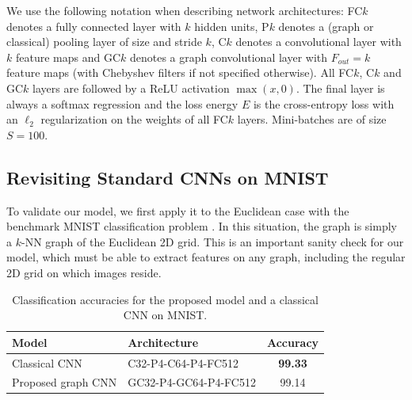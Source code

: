 \documentclass{article}
\newcommand{\todo}[1]{{\color{red} #1 }}
\begin{document}
We use the following notation when describing network architectures: FC$k$
denotes a fully connected layer with $k$ hidden units, P$k$ denotes a (graph or
classical) pooling layer of size and stride $k$, C$k$ denotes a convolutional
layer with $k$ feature maps and GC$k$ denotes a graph convolutional layer with
$F_{out} = k$ feature maps (with Chebyshev filters if not specified otherwise).
All FC$k$, C$k$ and GC$k$ layers are followed by a ReLU activation $\max(x,0)$.
The final layer is always a softmax regression and the loss energy $E$ is the
cross-entropy loss with an $\ell_2$ regularization on the weights of all
FC$k$ layers. Mini-batches are of size $S = 100$.  %













\subsection{Revisiting Standard CNNs on MNIST} \label{sec:MNIST}

To validate our model, we first apply it to the Euclidean case with the benchmark MNIST classification
problem \cite{pro:LeCunBottouBengioHaffner98MNIST}. In this situation, the graph is simply a $k$-NN graph of the Euclidean 2D grid. This is an important sanity check for our model, which must be able to extract
features on any graph, including the regular 2D grid on which images reside.


\begin{table}[h!]
\centering
\begin{tabular}{llc}
\toprule
Model & Architecture & Accuracy \\
\midrule
Classical CNN & C32-P4-C64-P4-FC512 & \textbf{99.33}  \\
Proposed graph CNN & GC32-P4-GC64-P4-FC512 & 99.14  \\
\bottomrule
\end{tabular}
\caption{Classification accuracies for the proposed model and a classical CNN on
MNIST.} 
\label{tab:mnist}
\end{table}
\end{document}
